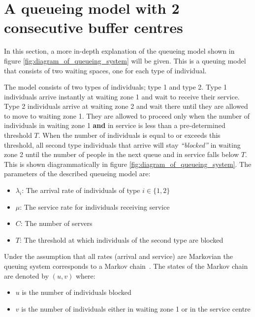 \section{A queueing model with 2 consecutive buffer centres}\label{sec:queueing_model}
In this section, a more in-depth explanation of the queueing model shown in 
figure \ref{fig:diagram_of_queueing_system} will be given.
This is a queuing model that consists of two waiting spaces, one for each type
of individual.

The model consists of two types of individuals; type 1 and type 2.
Type 1 individuals arrive instantly at waiting zone 1 and wait to receive their 
service. 
Type 2 individuals arrive at waiting zone 2 and wait there until they are 
allowed to move to waiting zone 1. 
They are allowed to proceed only when the number of 
individuals in waiting zone 1 \textbf{and} in service is less than a 
pre-determined threshold \(T\).
When the number of individuals is equal to or exceeds this threshold, all 
second type individuals that arrive will stay 
\textit{``blocked''} in waiting zone 2 until the number of people in 
the next queue and in service falls below \(T\). 
This is shown diagrammatically in figure \ref{fig:diagram_of_queueing_system}.
The parameters of the described queueing model are:

\begin{itemize}
    \item \(\lambda_i\): The arrival rate of individuals of type 
    \(i\in\{1, 2\}\)
    \item \(\mu\): The service rate for individuals receiving service
    \item \(C\): The number of servers
    \item \(T\): The threshold at which individuals of the second type are 
    blocked
\end{itemize}

Under the assumption that all rates (arrival and service) are Markovian the
queuing system corresponds to a Markov chain~\cite{kemeny1976markov}.
The states of the Markov chain are denoted by \((u,v)\) where:

\begin{itemize}
    \item \(u\) is the number of individuals blocked
    \item \(v\) is the number of individuals either in waiting zone 1 or in the
    service centre
\end{itemize}

